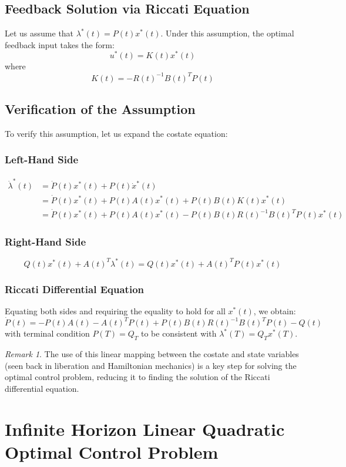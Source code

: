 \documentclass[openany]{book}
\theoremstyle{definition}
\theoremstyle{remark}
\newtheorem*{remark}{Remark}
\begin{document}
\subsection{Feedback Solution via Riccati Equation}
Let us assume that $\lambda^*(t) = P(t)x^*(t)$. Under this assumption, the optimal feedback input takes the form:
\[
    u^*(t) = K(t)x^*(t)
\]
where
\[
    K(t) = -R(t)^{-1}B(t)^TP(t)
\]

\subsection{Verification of the Assumption}
To verify this assumption, let us expand the costate equation:

\subsubsection{Left-Hand Side}
\begin{align*}
    \dot{\lambda}^*(t) &= \dot{P}(t)x^*(t) + P(t)\dot{x}^*(t)\\
    &= \dot{P}(t)x^*(t) + P(t)A(t)x^*(t) + P(t)B(t)K(t)x^*(t)\\
    &= \dot{P}(t)x^*(t) + P(t)A(t)x^*(t) - P(t)B(t)R(t)^{-1}B(t)^TP(t)x^*(t)
\end{align*}

\subsubsection{Right-Hand Side}
\[
    Q(t)x^*(t) + A(t)^T\lambda^*(t) = Q(t)x^*(t) + A(t)^TP(t)x^*(t)
\]

\subsubsection{Riccati Differential Equation}
Equating both sides and requiring the equality to hold for all $x^*(t)$, we obtain:
\[
    \dot{P}(t) = -P(t)A(t) - A(t)^TP(t) + P(t)B(t)R(t)^{-1}B(t)^TP(t) - Q(t)
\]
with terminal condition $P(T) = Q_T$ to be consistent with $\lambda^*(T) = Q_Tx^*(T)$.

\begin{remark}
The use of this linear mapping between the costate and state variables (seen back in liberation and Hamiltonian mechanics) is a key step for solving the optimal control problem, reducing it to finding the solution of the Riccati differential equation.
\end{remark}

\section{Infinite Horizon Linear Quadratic Optimal Control Problem}
\end{document}

